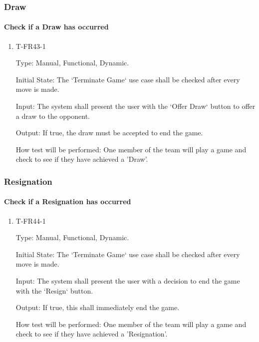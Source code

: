 \documentclass[12pt, titlepage]{article}
\begin{document}
\subsubsection{Draw}

    \paragraph{Check if a Draw has occurred}

            \begin{enumerate}

            \item{T-FR43-1\\}

                Type: Manual, Functional, Dynamic.
                					
                Initial State: The ‘Terminate Game‘ use case shall be checked after every move is made.
                					
                Input: The system shall present the user with the ‘Offer Draw‘ button to offer a draw to the opponent.
                					
                Output: If true, the draw must be accepted to end the game.

                How test will be performed: One member of the team will play a game and check to see if they have achieved a 'Draw'.

            \end{enumerate}

\subsubsection{Resignation}

    \paragraph{Check if a Resignation has occurred}

            \begin{enumerate}

            \item{T-FR44-1\\}

                Type: Manual, Functional, Dynamic.
                					
                Initial State: The ‘Terminate Game‘ use case shall be checked after every move is made.
                					
                Input: The system shall present the user with a decision to end the game with the ‘Resign‘ button.
                					
                Output: If true, this shall immediately end the game.

                How test will be performed: One member of the team will play a game and check to see if they have achieved a 'Resignation'.

            \end{enumerate}
\end{document}
